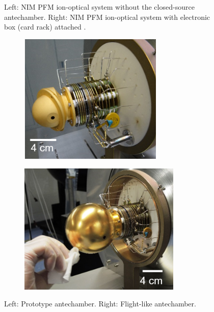 \begin{figure}[h]
\begin{subfigure}{0.5\textwidth}
		\end{subfigure}
		\caption{Left: NIM PFM ion-optical system without the closed-source antechamber. Right: NIM PFM ion-optical system with electronic box (card rack) attached \cite{Foehn2021}.}
		\label{fig:SetupPFM}
	\end{figure}
	\begin{figure}[h!] %
		\begin{subfigure}{0.5\textwidth}
			\centering
			\includegraphics[width = 0.75\textwidth]{Setup/Antechamber_Proto.png}
		\end{subfigure}
		\begin{subfigure}{0.5\textwidth}
			\centering
			\includegraphics[width = 0.85\textwidth]{Setup/Antechamber_Flight.png}
		\end{subfigure}
		\caption{Left: Prototype antechamber. Right: Flight-like antechamber.}
		\label{fig:SetupAntecham}
	\end{figure}
